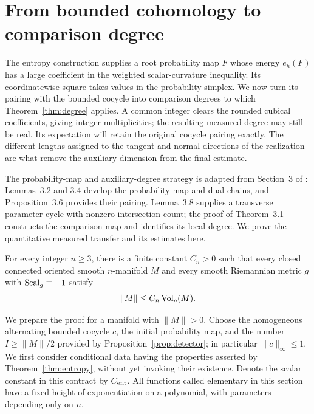 \section{From bounded cohomology to comparison degree}\label{sec:transfer}

The entropy construction supplies a root probability map \(F\) whose
energy \(e_h(F)\) has a large coefficient in the weighted scalar-curvature
inequality.  Its coordinatewise square takes values in the probability
simplex.  We now turn its pairing with the bounded cocycle into comparison
degrees to which Theorem~\ref{thm:degree} applies.  A common integer
clears the rounded cubical coefficients, giving integer multiplicities;
the resulting measured degree may still be real.  Its expectation will
retain the original cocycle pairing exactly.  The different lengths
assigned to the tangent and normal directions of the realization are
what remove the auxiliary dimension from the final estimate.

The probability-map and auxiliary-degree strategy is adapted from
Section~3 of \cite{OpenAIScalarInessentiality2026}: Lemmas~3.2 and 3.4
develop the probability map and dual chains, and Proposition~3.6 provides
their pairing.  Lemma~3.8 supplies a transverse parameter cycle with
nonzero intersection count; the proof of Theorem~3.1 constructs the
comparison map and identifies its local degree.  We prove the
quantitative measured transfer and its estimates here.

\begin{theorem}\label{thm:scalar-volume}
For every integer \(n\geq 3\), there is a finite constant \(C_n>0\) such
that every closed connected oriented smooth \(n\)-manifold \(M\) and every
smooth Riemannian metric \(g\) with \(\operatorname{Scal}_g\equiv-1\) satisfy
\[
                         \|M\|\leq C_n\operatorname{Vol}_g(M).
\]
\end{theorem}

We prepare the proof for a manifold with \(\|M\|>0\).  Choose the
homogeneous alternating bounded cocycle \(c\), the initial probability
map, and the number \(I\geq\|M\|/2\) provided by
Proposition~\ref{prop:detector}; in particular \(\|c\|_\infty\leq1\).
We first consider conditional data having the properties asserted by
Theorem~\ref{thm:entropy}, without yet invoking their existence.
Denote the scalar constant in this contract by \(C_{\rm ent}\).
All functions called elementary in this section have a fixed height of
exponentiation on a polynomial, with parameters depending only on \(n\).

